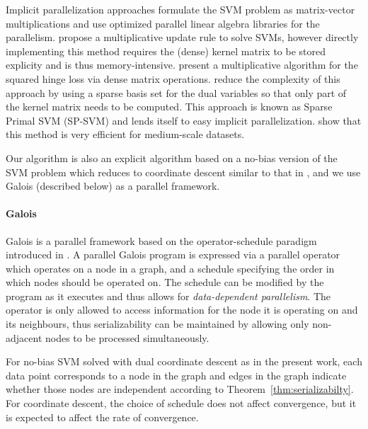 Implicit parallelization approaches formulate the SVM problem as matrix-vector multiplications and use optimized parallel linear algebra libraries for the parallelism. \cite{sha2002multiplicative} propose a multiplicative update rule to solve SVMs, however directly implementing this method requires the (dense) kernel matrix to be stored explicity and is thus memory-intensive. \cite{chapelle2007training} present a multiplicative algorithm for the squared hinge loss via dense matrix operations. \cite{keerthi2006building} reduce the complexity of this approach by using a sparse basis set for the dual variables so that only part of the kernel matrix needs to be computed. This approach is known as Sparse Primal SVM (SP-SVM) and lends itself to easy implicit parallelization. \cite{tyree2014parallel} show that this method is very efficient for medium-scale datasets.

Our algorithm is also an explicit algorithm based on a no-bias version of the SVM problem which reduces to coordinate descent similar to that in \cite{hsieh2013divide}, and we use Galois (described below) as a parallel framework.

\paragraph{Galois}
Galois is a parallel framework based on the operator-schedule paradigm introduced in \cite{pingali2011tao}. A parallel Galois program is expressed via a parallel operator which operates on a node in a graph, and a schedule specifying the order in which nodes should be operated on. The schedule can be modified by the program as it executes and thus allows for \emph{data-dependent parallelism}. The operator is only allowed to access information for the node it is operating on and its neighbours, thus serializability can be maintained by allowing only non-adjacent nodes to be processed simultaneously.

For no-bias SVM solved with dual coordinate descent as in the present work, each data point corresponds to a node in the graph and edges in the graph indicate whether those nodes are independent according to Theorem~\ref{thm:serializabilty}. For coordinate descent, the choice of schedule does not affect convergence, but it is expected to affect the rate of convergence.